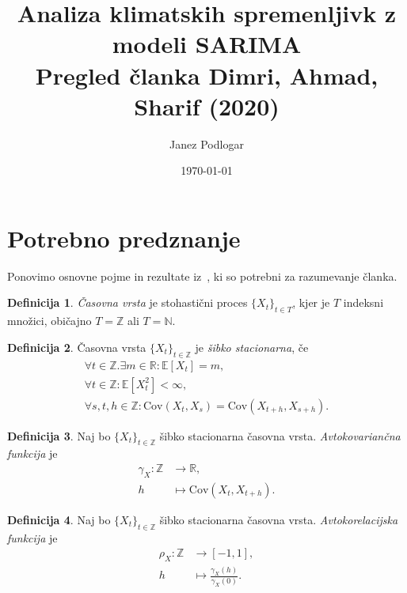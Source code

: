 \documentclass[11pt]{amsart}
\title{Analiza klimatskih spremenljivk z modeli SARIMA \\
\large{Pregled \v{c}lanka Dimri, Ahmad, Sharif (2020)}}
\author{Janez Podlogar}
\date{\today}
\newcommand{\N}{\mathbb{N}}
\newcommand{\Z}{\mathbb{Z}}
\newcommand{\R}{\mathbb{R}}
\newcommand{\E}{\mathbb{E}}
\newcommand{\Cov}{\mathrm{Cov}}
\theoremstyle{definition}
\newtheorem{definicija}{Definicija}[section]
\theoremstyle{plain}
\begin{document}
\maketitle

\begin{abstract}

\end{abstract}

\section{Potrebno predznanje}

Ponovimo osnovne pojme in rezultate iz~\cite{basrak}, ki so potrebni za razumevanje članka.

\begin{definicija}
    \emph{Časovna vrsta} je stohastični proces $\{X_t\}_{t \in T}$, kjer je $T$ 
    indeksni množici, običajno $T = \Z$ ali $T = \N$.
\end{definicija}

\begin{definicija}
    Časovna vrsta $\{X_t\}_{t \in \Z}$ je \emph{šibko stacionarna}, če
    \begin{gather*}
        \forall t \in \Z. \exists m \in \R \colon \E[X_t] = m, \\ 
        \forall t \in \Z \colon \E[X_t^2] < \infty, \\
        \forall s,t,h \in \Z \colon \Cov(X_t, X_s) = \Cov(X_{t+h}, X_{s+h}).
    \end{gather*}
\end{definicija}

\begin{definicija}
    Naj bo $\{X_t\}_{t \in \Z}$ šibko stacionarna časovna vrsta. \emph{Avtokovariančna funkcija} je
    \begin{align*}
        \gamma_X \colon \Z &\to \R, \\
        h &\mapsto \Cov(X_{t}, X_{t+h}).
    \end{align*}
\end{definicija}

\begin{definicija}
    Naj bo $\{X_t\}_{t \in \Z}$ šibko stacionarna časovna vrsta. \emph{Avtokorelacijska funkcija}
    je
    \begin{align*}
        \rho_X \colon \Z &\to [-1,1], \\
        h &\mapsto \frac{\gamma_X(h)}{\gamma_X(0)}.
    \end{align*}
\end{definicija}
\end{document}
